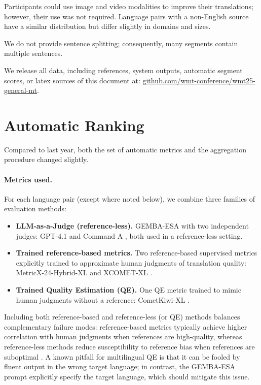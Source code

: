 \documentclass[11pt]{article}
\begin{document}
Participants could use image and video modalities to improve their translations; however, their use was not required.
Language pairs with a non-English source have a similar distribution but differ slightly in domains and sizes.

We do not provide sentence splitting; consequently, many segments contain multiple sentences.

We release all data, including references, system outputs, automatic segment scores, or latex sources of this document at: \href{https://github.com/wmt-conference/wmt25-general-mt}{github.com/wmt-conference/wmt25-general-mt}.


\section*{Automatic Ranking}
\label{sec:automatic-ranking}

Compared to last year, both the set of automatic metrics and the aggregation procedure changed slightly.

\paragraph{Metrics used.}
For each language pair (except where noted below), we combine three families of evaluation methods:
\begin{itemize}
    \item \textbf{LLM-as-a-Judge (reference-less).} GEMBA-ESA \citep{kocmi-federmann-2023-large} with two independent judges: GPT-4.1 \citep{openai_gpt41_2025} and Command A \citep{cohere2025commandaenterprisereadylarge}, both used in a reference-less setting.
    \item \textbf{Trained reference-based metrics.} Two reference-based supervised metrics explicitly trained to approximate human judgments of translation quality: MetricX-24-Hybrid-XL \citep{juraska-etal-2024-metricx} and XCOMET-XL \citep{guerreiro-etal-2024-xcomet}.
    \item \textbf{Trained Quality Estimation (QE).} One QE metric trained to mimic human judgments without a reference: CometKiwi-XL \citep{rei-etal-2023-scaling}.
\end{itemize}
Including both reference-based and reference-less (or QE) methods balances complementary failure modes: reference-based metrics typically achieve higher correlation with human judgments when references are high-quality, whereas reference-less methods reduce susceptibility to reference bias when references are suboptimal \citep{freitag-etal-2023-results}. A known pitfall for multilingual QE is that it can be fooled by fluent output in the wrong target language; in contrast, the GEMBA-ESA prompt explicitly specify the target language, which should mitigate this issue.
\end{document}
